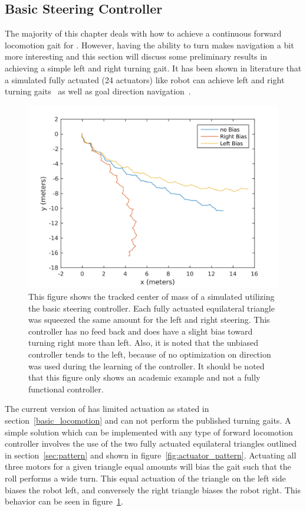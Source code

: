 \subsection{Basic Steering Controller}
\label{sec:steering}
The majority of this chapter deals with how to achieve a continuous forward locomotion gait for \SB{}.
However, having the ability to turn makes navigation a bit more interesting and this section will discuss some preliminary results in achieving a simple left and right turning gait.
It has been shown in literature that a simulated fully actuated (24 actuators) \SB{} like robot can achieve left and right turning gaits~\cite{kim2014rapid} as well as goal direction navigation~\cite{iscen2014flop}.

\begin{figure}[thbp]
    \vspace{-0.1in}
    \centering
    \includegraphics[width=0.8\linewidth]{tex/img/left_right_paths}
    \caption{
    This figure shows the tracked center of mass of a simulated \SB{} utilizing the basic steering controller.
    Each fully actuated equilateral triangle was squeezed the same amount for the left and right steering.
    This controller has no feed back and does have a slight bias toward turning right more than left.
    Also, it is noted that the unbiased controller tends to the left, because of no optimization on direction was used during the learning of the controller.
    It should be noted that this figure only shows an academic example and not a fully functional controller.
    }
    \label{fig:turning}
    \vspace{-0.1in}
\end{figure}

The current version of \SB{} has limited actuation as stated in section~\ref{basic_locomotion} and can not perform the published turning gaits.
A simple solution which can be implemented with any type of forward locomotion controller involves the use of the two fully actuated equilateral triangles outlined in section~\ref{sec:pattern} and shown in figure~\ref{fig:actuator_pattern}.
Actuating all three motors for a given triangle equal amounts will bias the gait such that the roll performs a wide turn.
This equal actuation of the triangle on the left side biases the robot left, and conversely the right triangle biases the robot right.
This behavior can be seen in figure~\ref{fig:turning}.

